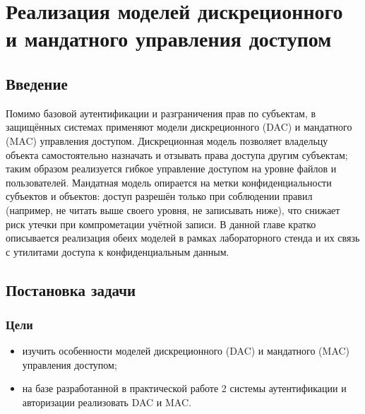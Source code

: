 \documentclass[areasetadvanced]{scrartcl}
\begin{document}

\newpage
\section{Реализация моделей дискреционного и мандатного управления доступом}
\subsection{Введение}

Помимо базовой аутентификации и разграничения прав по субъектам, в защищённых системах применяют модели дискреционного (DAC) и мандатного (MAC) управления доступом. Дискреционная модель позволяет владельцу объекта самостоятельно назначать и отзывать права доступа другим субъектам; таким образом реализуется гибкое управление доступом на уровне файлов и пользователей. Мандатная модель опирается на метки конфиденциальности субъектов и объектов: доступ разрешён только при соблюдении правил (например, \guillemetleft не читать выше своего уровня\guillemetright, \guillemetleft не записывать ниже\guillemetright), что снижает риск утечки при компрометации учётной записи. В данной главе кратко описывается реализация обеих моделей в рамках лабораторного стенда и их связь с утилитами доступа к конфиденциальным данным.

\subsection{Постановка задачи}

\subsubsection{Цели}
\begin{itemize}
    \item изучить особенности моделей дискреционного (DAC) и мандатного (MAC) управления доступом;
    \item на базе разработанной в практической работе 2 системы аутентификации и авторизации реализовать DAC и MAC.
\end{itemize}
\end{document}

